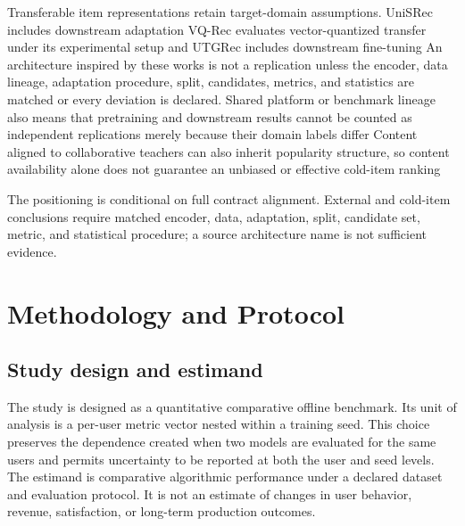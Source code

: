 \documentclass[10pt,a4paper]{article}
\begin{document}
Transferable item representations retain target-domain assumptions. UniSRec
includes downstream adaptation
\cite{hou2022_unisrec} %
VQ-Rec evaluates vector-quantized transfer under its experimental setup
\cite{hou2023_vqrec} %
and UTGRec includes downstream fine-tuning
\cite{zheng2026_utgrec} %
An architecture inspired by these works is not a replication unless the encoder,
data lineage, adaptation procedure, split, candidates, metrics, and statistics
are matched or every deviation is declared. Shared platform or benchmark
lineage also means that pretraining and downstream results cannot be counted as
independent replications merely because their domain labels differ
\cite{meehan2025_cold_popbias} %
\cite{meehan2026_semco} %
Content aligned to collaborative teachers can also inherit popularity structure,
so content availability alone does not guarantee an unbiased or effective
cold-item ranking
\cite{meehan2025_cold_popbias} %

The positioning is conditional on full contract alignment. External and
cold-item conclusions require matched encoder, data, adaptation, split,
candidate set, metric, and statistical procedure; a source architecture name is
not sufficient evidence.

\section{Methodology and Protocol}

\subsection{Study design and estimand}

The study is designed as a quantitative comparative offline benchmark. Its unit
of analysis is a per-user metric vector nested within a training seed. This
choice preserves the dependence created when two models are evaluated for the
same users and permits uncertainty to be reported at both the user and seed
levels. The estimand is comparative algorithmic performance under a declared
dataset and evaluation protocol. It is not an estimate of changes in user
behavior, revenue, satisfaction, or long-term production outcomes.
\end{document}
